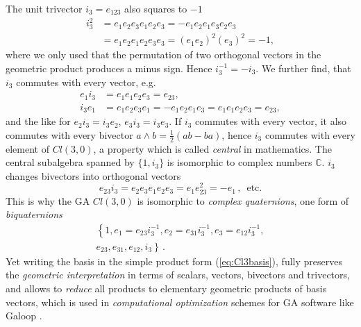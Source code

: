 \documentclass[cameraready]{jcmsi}%
\newcommand{\C}{\mathbb{C}}
\newcommand{\be}{\begin{equation}}
\newcommand{\ee}{\end{equation}}
\begin{document}
The unit trivector $i_3=e_{123}$ also squares to $-1$
\begin{align}
  i_3^2 &= e_1e_2e_3e_1e_2e_3 
  = - e_1e_2e_1e_3e_2e_3 \nonumber \\
  &= e_1e_2e_1e_2 e_3e_3 = (e_1e_2)^2 (e_3)^2 = -1,
\end{align}
where we only used that the permutation of two orthogonal vectors in the geometric product produces a minus sign. Hence $i_3^{-1} = - i_3$. We further find, that $i_3$ commutes with every vector, e.g.
\begin{align} 
  e_1 i_3 &= e_1 e_1e_2e_3 = e_{23}, 
  \\
  i_3 e_1 &= e_1e_2e_3 e_1 = - e_1e_2e_1e_3 = e_1e_1 e_2e_3 = e_{23}, 
  \nonumber 
\end{align} 
and the like for $e_2 i_3 = i_3 e_2$, $e_3 i_3 = i_3 e_3$. If $i_3$ commutes with every vector, it also commutes with every bivector $a\wedge b = \frac{1}{2}(ab-ba)$, hence $i_3$ commutes with every element of $Cl(3,0)$, a property which is called \textit{central} in mathematics. The central subalgebra spanned by $\{1,i_3\}$ is isomorphic to complex numbers $\C$. $i_3$ changes bivectors into orthogonal vectors
\be 
  e_{23} i_3 = e_2e_3e_1e_2e_3 = e_1 e_{23}^2 = -e_1\,, \,\,\, \text{etc.}
\ee 
This is why the GA $Cl(3,0)$ is isomorphic to \textit{complex quaternions}, one form of \textit{biquaternions}
\begin{gather} 
  \left\{ 1, e_1 = e_{23}i_3^{-1}, e_2 = e_{31}i_3^{-1}, e_3 = e_{12}i_3^{-1}, \right.
  \nonumber \\
  \left. e_{23}, e_{31}, e_{12}, i_3 \right\} \,. 
\end{gather} 
Yet writing the basis in the simple product form (\ref{eq:Cl3basis}), fully preserves the \textit{geometric interpretation} in terms of scalars, vectors, bivectors and trivectors, and allows to \textit{reduce} all products to elementary geometric products of basis vectors, which is used in \textit{computational optimization} schemes for GA software like Galoop \cite{HPK:Gaalop2010}. 
\end{document}
